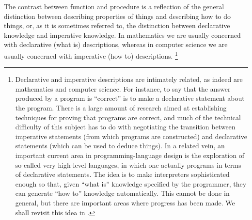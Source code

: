 The contrast between function and procedure is a reflection of the general distinction between describing properties of things and describing how to do things, or, as it is sometimes referred to, the distinction between declarative knowledge and imperative knowledge.
In mathematics we are usually concerned with declarative (what is) descriptions, whereas in computer science we are usually concerned with imperative (how to) descriptions.%
\footnote{
	Declarative and imperative descriptions are intimately related, as indeed are mathematics and computer science.
	For instance, to say that the answer produced by a program is “correct” is to make a declarative statement about the program.
	There is a large amount of research aimed at establishing techniques for proving that programs are correct, and much of the technical difficulty of this subject has to do with negotiating the transition between imperative statements (from which programs are constructed) and declarative statements (which can be used to deduce things).
	In a related vein, an important current area in programming-language design is the exploration of so-called very high-level languages, in which one actually programs in terms of declarative statements.
	The idea is to make interpreters sophisticated enough so that, given “what is” knowledge specified by the programmer, they can generate “how to” knowledge automatically.
	This cannot be done in general, but there are important areas where progress has been made.
	We shall revisit this idea in .
}

